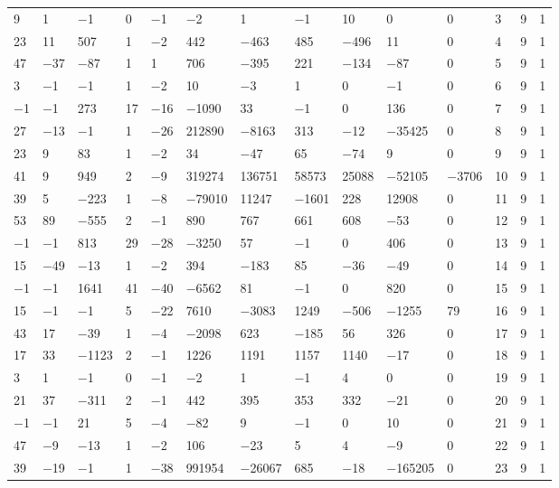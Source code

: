 \documentclass[pdftex]{sigma}
\numberwithin{equation}{section}
\theoremstyle{definition}
\numberwithin{table}{section}
\begin{document}
{\begin{paracol}{3}
\begin{supertabular}{|w{c}{.32cm}w{c}{.32cm}w{c}{.32cm}@{\hspace{.5cm}}w{c}{.2cm}w{c}{.2cm}|@{\hspace{\tabcolsep}}HHHHHHw{c}{.17cm}w{c}{.17cm}w{c}{.17cm}|}
			9 & 1 & $-$1 & 0 & $-$1 & $-$2 & 1 & $-$1 & 10 & 0 & 0 & 3 & 9 & 1 \\
			23 & 11 & 507 & 1 & $-$2 & 442 & $-$463 & 485 & $-$496 & 11 & 0 & 4 & 9 & 1 \\
			47 & $-$37 & $-$87 & 1 & 1 & 706 & $-$395 & 221 & $-$134 & $-$87 & 0 & 5 & 9 & 1 \\
			3 & $-$1 & $-$1 & 1 & $-$2 & 10 & $-$3 & 1 & 0 & $-$1 & 0 & 6 & 9 & 1 \\
			$-$1 & $-$1 & 273 & 17 & $-$16 & $-$1090 & 33 & $-$1 & 0 & 136 & 0 & 7 & 9 & 1 \\
			27 & $-$13 & $-$1 & 1 & $-$26 & 212890 & $-$8163 & 313 & $-$12 & $-$35425 & 0 & 8 & 9 & 1 \\
			23 & 9 & 83 & 1 & $-$2 & 34 & $-$47 & 65 & $-$74 & 9 & 0 & 9 & 9 & 1 \\
			41 & 9 & 949 & 2 & $-$9 & 319274 & 136751 & 58573 & 25088 & $-$52105 & $-$3706 & 10 & 9 & 1 \\
			39 & 5 & $-$223 & 1 & $-$8 & $-$79010 & 11247 & $-$1601 & 228 & 12908 & 0 & 11 & 9 & 1 \\
			53 & 89 & $-$555 & 2 & $-$1 & 890 & 767 & 661 & 608 & $-$53 & 0 & 12 & 9 & 1 \\
			$-$1 & $-$1 & 813 & 29 & $-$28 & $-$3250 & 57 & $-$1 & 0 & 406 & 0 & 13 & 9 & 1 \\
			15 & $-$49 & $-$13 & 1 & $-$2 & 394 & $-$183 & 85 & $-$36 & $-$49 & 0 & 14 & 9 & 1 \\
			$-$1 & $-$1 & 1641 & 41 & $-$40 & $-$6562 & 81 & $-$1 & 0 & 820 & 0 & 15 & 9 & 1 \\
			15 & $-$1 & $-$1 & 5 & $-$22 & 7610 & $-$3083 & 1249 & $-$506 & $-$1255 & 79 & 16 & 9 & 1 \\
			43 & 17 & $-$39 & 1 & $-$4 & $-$2098 & 623 & $-$185 & 56 & 326 & 0 & 17 & 9 & 1 \\
			17 & 33 & $-$1123 & 2 & $-$1 & 1226 & 1191 & 1157 & 1140 & $-$17 & 0 & 18 & 9 & 1 \\
			3 & 1 & $-$1 & 0 & $-$1 & $-$2 & 1 & $-$1 & 4 & 0 & 0 & 19 & 9 & 1 \\
			21 & 37 & $-$311 & 2 & $-$1 & 442 & 395 & 353 & 332 & $-$21 & 0 & 20 & 9 & 1 \\
			$-$1 & $-$1 & 21 & 5 & $-$4 & $-$82 & 9 & $-$1 & 0 & 10 & 0 & 21 & 9 & 1 \\
			47 & $-$9 & $-$13 & 1 & $-$2 & 106 & $-$23 & 5 & 4 & $-$9 & 0 & 22 & 9 & 1 \\
			39 & $-$19 & $-$1 & 1 & $-$38 & 991954 & $-$26067 & 685 & $-$18 & $-$165205 & 0 & 23 & 9 & 1 \\

\end{supertabular}
\end{paracol}}
\end{document}
